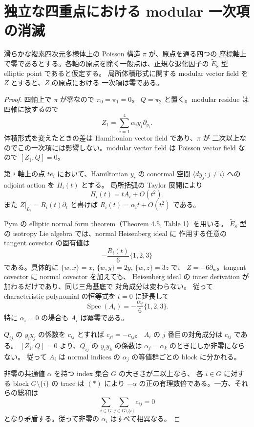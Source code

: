 \section{独立な四重点における modular 一次項の消滅}

\begin{proposition}
滑らかな複素四次元多様体上の Poisson 構造 $\pi$ が、原点を通る四つの
座標軸上で零であるとする。各軸の原点を除く一般点は、正規な退化因子の
$\widetilde E_8$ 型 elliptic point であると仮定する。
局所体積形式に関する modular vector field を $Z$ とすると、$Z$ の原点における
一次項は零である。
\end{proposition}

\begin{proof}
四軸上で $\pi$ が零なので $\pi_0=\pi_1=0$。
$Q=\pi_2$ と置く。modular residue は四軸に接するので
\[
 Z_1=\sum_{i=1}^4\alpha_i y_i\partial_{y_i}.
\]
体積形式を変えたときの差は Hamiltonian vector field であり、$\pi$ が
二次以上なのでこの一次項には影響しない。modular vector field は Poisson
vector field なので $[Z_1,Q]=0$。

第 $i$ 軸上の点 $t e_i$ において、Hamiltonian $y_i$ の conormal 空間
$\langle dy_j:j\ne i\rangle$ への adjoint action を $H_i(t)$ とする。
局所括弧の Taylor 展開により
\[
 H_i(t)=t A_i+O(t^2).
\]
また $Z|_{L_i}=R_i(t)\partial_t$ と書けば
$R_i(t)=\alpha_i t+O(t^2)$ である。

Pym の elliptic normal form theorem（Theorem 4.5, Table 1）を用いる。
$\widetilde E_8$ 型の isotropy Lie algebra では、normal Heisenberg ideal に
作用する任意の tangent covector の固有値は
\[
 -\frac{R_i(t)}6\{1,2,3\}
\]
である。具体的に $\{w,x\}=x$, $\{w,y\}=2y$, $\{w,z\}=3z$ で、
$Z=-6\partial_w$。tangent covector に normal covector を加えても、
Heisenberg ideal の inner derivation が加わるだけであり、同じ三角基底で
対角成分は変わらない。
従って characteristic polynomial の恒等式を $t=0$ に延長して
\[
 \operatorname{Spec}(A_i)
 =-\frac{\alpha_i}{6}\{1,2,3\}.
 \tag{*}
\]
特に $\alpha_i=0$ の場合も $A_i$ は冪零である。

$Q_{ij}$ の $y_i y_j$ の係数を $c_{ij}$ とすれば $c_{ji}=-c_{ij}$。
$A_i$ の $j$ 番目の対角成分は $c_{ij}$ である。
$[Z_1,Q]=0$ より、$Q_{ij}$ の $y_i y_k$ の係数は
$\alpha_j=\alpha_k$ のときにしか非零にならない。
従って $A_i$ は normal indices の $\alpha_j$ の等値群ごとの block に分かれる。

非零の共通値 $\alpha$ を持つ index 集合 $G$ の大きさが二以上なら、
各 $i\in G$ に対する block $G\setminus\{i\}$ の trace は $(*)$ により
$-\alpha$ の正の有理数倍である。一方、それらの総和は
\[
 \sum_{i\in G}\sum_{j\in G\setminus\{i\}}c_{ij}=0
\]
となり矛盾する。従って非零の $\alpha_i$ はすべて相異なる。


\end{proof}
